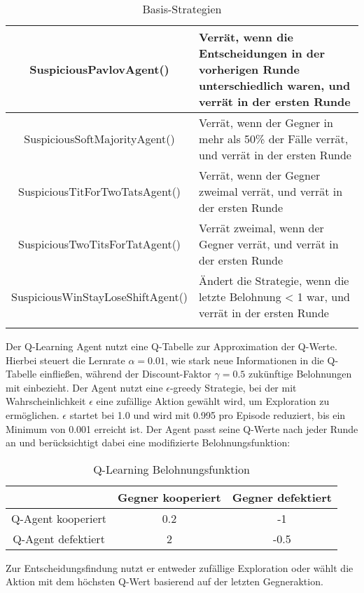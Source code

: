\begin{longtable}{|c|m{7cm}|}
    \hline
    SuspiciousPavlovAgent() & Verrät, wenn die Entscheidungen in der vorherigen Runde unterschiedlich waren, und verrät in der ersten Runde \\
    \hline
    SuspiciousSoftMajorityAgent() & Verrät, wenn der Gegner in mehr als 50\% der Fälle verrät, und verrät in der ersten Runde \\
    \hline
    SuspiciousTitForTwoTatsAgent() & Verrät, wenn der Gegner zweimal verrät, und verrät in der ersten Runde \\
    \hline
    SuspiciousTwoTitsForTatAgent() & Verrät zweimal, wenn der Gegner verrät, und verrät in der ersten Runde \\
    \hline
    SuspiciousWinStayLoseShiftAgent() & Ändert die Strategie, wenn die letzte Belohnung < 1 war, und verrät in der ersten Runde \\
    \hline
\caption{Basis-Strategien}
\label{table:basestrategies}
\end{longtable}

Der Q-Learning Agent nutzt eine Q-Tabelle zur Approximation der Q-Werte.
Hierbei steuert die Lernrate $\alpha=0.01$, wie stark neue Informationen in die Q-Tabelle einfließen, während der 
Discount-Faktor $\gamma=0.5$ zukünftige Belohnungen mit einbezieht. Der Agent nutzt eine $\epsilon$-greedy Strategie, 
bei der mit Wahrscheinlichkeit $\epsilon$ eine zufällige Aktion gewählt wird, um Exploration zu ermöglichen. 
$\epsilon$ startet bei 1.0 und wird mit 0.995 pro Episode reduziert, bis ein Minimum von 0.001 erreicht ist. 
Der Agent passt seine Q-Werte nach jeder Runde an und berücksichtigt dabei eine modifizierte Belohnungsfunktion:
\begin{table}[h!]
    \centering
    \begin{tabular}{c|c|c}
            & Gegner kooperiert & Gegner defektiert\\
        \hline
        Q-Agent kooperiert &  0.2 & -1 \\
        \hline
        Q-Agent defektiert &  2 & -0.5 \\
    \end{tabular}
    \caption{Q-Learning Belohnungsfunktion}
\end{table}
Zur Entscheidungsfindung nutzt er entweder zufällige
Exploration oder wählt die Aktion mit dem höchsten Q-Wert basierend auf der letzten Gegneraktion.

